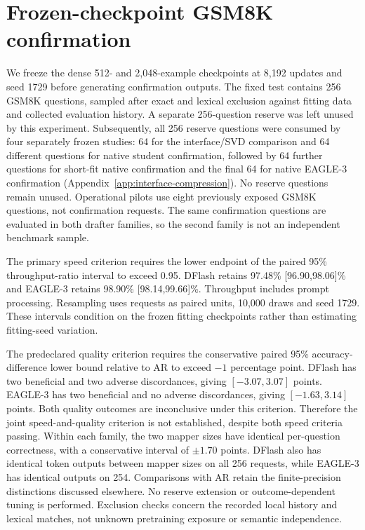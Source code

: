 \documentclass{article}
\begin{document}
\section{Frozen-checkpoint GSM8K confirmation}
\label{app:frozen-confirmation}
We freeze the dense 512- and 2,048-example checkpoints at 8,192 updates
and seed 1729 before generating confirmation outputs. The fixed test
contains 256 GSM8K questions, sampled after exact and lexical exclusion
against fitting data and collected evaluation history. A separate
256-question reserve was left unused by this experiment. Subsequently,
all 256 reserve questions were consumed by four separately frozen studies:
64 for the interface/SVD comparison and 64 different questions for native
student confirmation, followed by 64 further questions for short-fit
native confirmation and the final 64 for native EAGLE-3 confirmation
(Appendix~\ref{app:interface-compression}). No reserve questions remain unused.
Operational pilots use eight
previously exposed GSM8K questions, not confirmation requests.
The same confirmation questions are evaluated in both drafter families,
so the second family is not an independent benchmark sample.

The primary speed criterion requires the lower endpoint of the paired
95\% throughput-ratio interval to exceed 0.95. DFlash retains
97.48\% [96.90,98.06]\% and EAGLE-3 retains 98.90\% [98.14,99.66]\%.
Throughput includes prompt processing. Resampling uses requests as paired
units, 10,000 draws and seed 1729. These intervals condition on the
frozen fitting checkpoints rather than estimating fitting-seed variation.

\begin{table}[H]
\caption{All frozen-confirmation methods on 256 GSM8K requests per family.
At cap counts outputs of exactly 2,048 tokens. Comparisons are within
each family's runtime.}
\label{tab:frozen-confirmation-controls}
\centering\small

\end{table}

The predeclared quality criterion requires the conservative paired
95\% accuracy-difference lower bound relative to AR to exceed $-1$
percentage point. DFlash has two beneficial and two adverse discordances,
giving $[-3.07,3.07]$ points. EAGLE-3 has two beneficial and no adverse
discordances, giving $[-1.63,3.14]$ points. Both quality outcomes are
inconclusive under this criterion. Therefore the joint speed-and-quality
criterion is not established, despite both speed criteria passing.
Within each family, the two mapper sizes have identical per-question
correctness, with a conservative interval of $\pm1.70$ points.
DFlash also has identical token outputs between mapper sizes on all 256
requests, while EAGLE-3 has identical outputs on 254. Comparisons with
AR retain the finite-precision distinctions discussed elsewhere.
No reserve extension or outcome-dependent tuning is performed.
Exclusion checks concern the recorded local history and lexical matches,
not unknown pretraining exposure or semantic independence.
\end{document}
